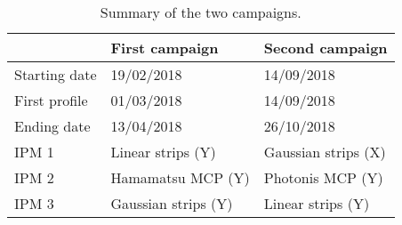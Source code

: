 \begin{table}[!h]
  \centering
  \caption[Summary of the two campaigns]{Summary of the two campaigns.}
  \label{chap4:IPHI_campaign}
  \begin{tabularx}{\linewidth}{XXX}
    \toprule
                  & First campaign      & Second campaign     \\
    \midrule
    Starting date & 19/02/2018          & 14/09/2018          \\
    First profile & 01/03/2018          & 14/09/2018          \\
    Ending date   & 13/04/2018          & 26/10/2018          \\
    IPM 1         & Linear strips (Y)   & Gaussian strips (X) \\
    IPM 2         & Hamamatsu MCP (Y)   & Photonis MCP (Y)    \\
    IPM 3         & Gaussian strips (Y) & Linear strips (Y)   \\
    \bottomrule
  \end{tabularx}
\end{table}